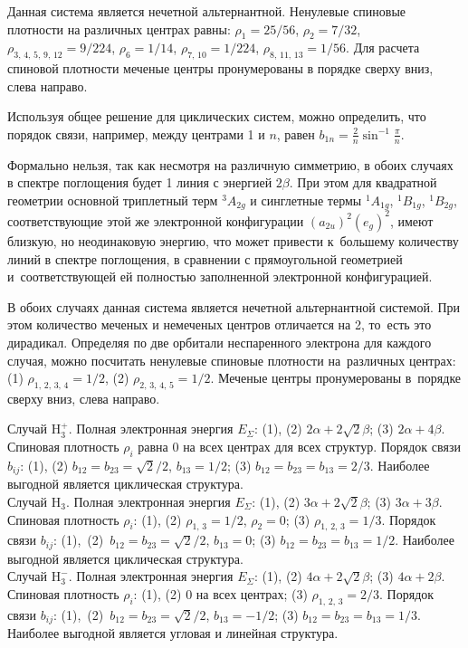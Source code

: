  Данная система является нечетной альтернантной. Ненулевые спиновые плотности на различных центрах равны: $\rho_1 = 25/56$, $\rho_2 = 7/32$, $\rho_{3,\,4,\,5,\,9,\,12} = 9/224$, $\rho_6 = 1/14$, $\rho_{7,\,10} = 1/224$, $\rho_{8,\,11,\,13} = 1/56$. Для расчета спиновой плотности меченые центры пронумерованы в порядке сверху вниз, слева направо.\par
{} Используя общее решение для циклических систем, можно определить, что порядок связи, например, между центрами 1 и $n$, равен $b_{1n}=\frac{2}{n}\sin^{-1}{\frac{\pi}{n}}$.\par
{} Формально нельзя, так как несмотря на различную симметрию, в обоих случаях в спектре поглощения будет 1 линия с энергией $2\beta$. При этом для квадратной геометрии основной триплетный терм $^3A_{2g}$ и синглетные термы $^1A_{1g}$, $^1B_{1g}$, $^1B_{2g}$, соответствующие этой же электронной конфигурации $(a_{2u})^2(e_g)^2$, имеют близкую, но неодинаковую энергию, что может привести к~большему количеству линий в спектре поглощения, в сравнении с прямоугольной геометрией и~соответствующей ей полностью заполненной электронной конфигурацией.\par
{} В обоих случаях данная система является нечетной альтернантной системой. При этом количество меченых и немеченых центров отличается на 2, то~есть это дирадикал. Определяя по две орбитали неспаренного электрона для каждого случая, можно посчитать ненулевые спиновые плотности на~различных центрах: (1) $\rho_{1,\,2,\,3,\,4} = 1/2$, (2) $\rho_{2,\,3,\,4,\,5} = 1/2$. Меченые центры пронумерованы в~порядке сверху вниз, слева направо.\par
{} Случай $\text{H}_3^+$. Полная электронная энергия $E_{\Sigma}$: (1), (2) $2\alpha + 2\sqrt2 \beta$; (3) $2\alpha + 4 \beta$. Спиновая плотность $\rho_i$ равна 0 на всех центрах для всех структур. Порядок связи $b_{ij}$: (1), (2) $b_{12}=b_{23}=\sqrt2 / 2$, $b_{13}=1/2$; (3) $b_{12}=b_{23}=b_{13}=2/3$. Наиболее выгодной является циклическая структура.\\
Случай $\text{H}_3$. Полная электронная энергия $E_{\Sigma}$: (1), (2) $3\alpha + 2\sqrt2 \beta$; (3) $3\alpha + 3 \beta$. Спиновая плотность $\rho_i$: (1), (2) $\rho_{1,\,3}=1/2$, $\rho_2=0$; (3) $\rho_{1,\,2,\,3}=1/3$. Порядок связи $b_{ij}$: (1),~(2)~$b_{12}=b_{23}=\sqrt2 / 2$, $b_{13}=0$; (3) $b_{12}=b_{23}=b_{13}=1/2$. Наиболее выгодной является циклическая структура.\\
Случай $\text{H}_3^-$. Полная электронная энергия $E_{\Sigma}$: (1), (2) $4\alpha + 2\sqrt2 \beta$; (3) $4\alpha + 2 \beta$. Спиновая плотность $\rho_i$: (1), (2) 0 на всех центрах; (3) $\rho_{1,\,2,\,3}=2/3$. Порядок связи $b_{ij}$: (1),~(2)~$b_{12}=b_{23}=\sqrt2 / 2$, $b_{13}=-1/2$; (3) $b_{12}=b_{23}=b_{13}=1/3$. Наиболее выгодной является угловая и линейная структура.\par
